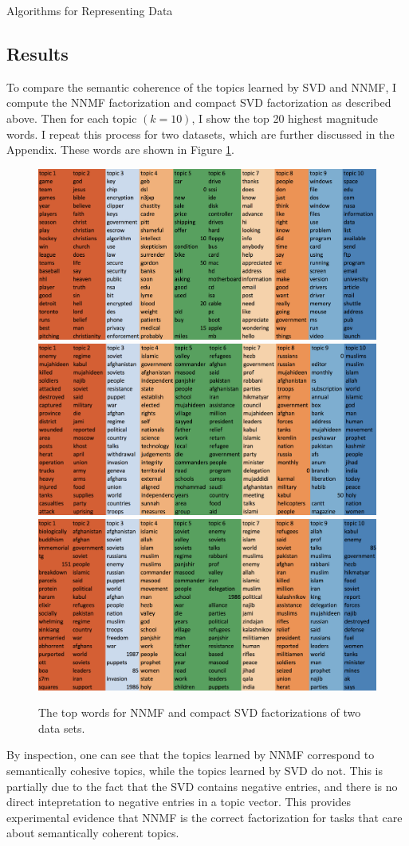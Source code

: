 \documentclass[12pt]{pom_thesis}
\begin{document}
\begin{chapter}{Algorithms for Representing Data}
\subsection*{Results}
To compare the semantic coherence of the topics learned by SVD and NNMF, I compute the NNMF factorization and compact SVD factorization as described above. Then for each topic $(k=10)$, I show the top 20 highest magnitude words. I repeat this process for two datasets, which are further discussed in the Appendix. These words are shown in Figure \ref{fig:svdnnmf}.
\begin{figure}[h]
	\label{fig:svdnnmf}
	\centering
	\includegraphics[width=.75\textwidth]{nnmf-news}
		\includegraphics[width=.75\textwidth]{nnmf-afghan}
				\includegraphics[width=.75\textwidth]{svd-afghan}
	\caption{The top words for NNMF and compact SVD factorizations of two data sets.}
\end{figure}
By inspection, one can see that the topics learned by NNMF correspond to semantically cohesive topics, while the topics learned by SVD do not. This is partially due to the fact that the SVD contains negative entries, and there is no direct intepretation to negative entries in a topic vector. This provides experimental evidence that NNMF is the correct factorization for tasks that care about semantically coherent topics.
\end{chapter}
\end{document}
